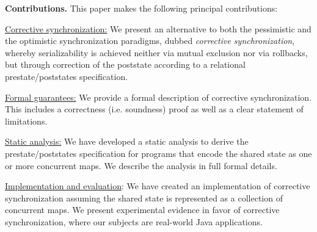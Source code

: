 
\noindent \textbf{Contributions.} This paper makes the following principal contributions:
\begin{compactenum}
	\item \underline{Corrective synchronization:} We present an alternative to both the pessimistic and the optimistic synchronization paradigms, dubbed \emph{corrective synchronization}, whereby serializability is achieved neither via mutual exclusion nor via rollbacks, but through correction of the poststate according to a relational prestate/poststates specification.
	\item \underline{Formal guarantees:} We provide a formal description of corrective synchronization. This includes a correctness (i.e. soundness) proof as well as a clear statement of limitations.
	\item \underline{Static analysis:} We have developed a static analysis to derive the prestate/poststates specification for programs that encode the shared state as one or more concurrent maps. We describe the analysis in full formal details.
	\item \underline{Implementation and evaluation}: We have created an implementation of corrective synchronization assuming the shared state is represented as a collection of concurrent maps. We present experimental evidence in favor of corrective synchronization, where our subjects are real-world Java applications.
\end{compactenum}